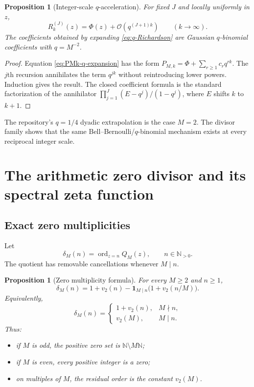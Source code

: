 \documentclass[11pt,oneside]{article}
\newtheorem{proposition}[theorem]{Proposition}
\theoremstyle{definition}
\theoremstyle{remark}
\newcommand{\N}{\mathbb N}
\newcommand{\bigO}{\mathcal O}
\newcommand{\vtwo}{v_2}
\numberwithin{equation}{section}
\newcommand{\ord}{\operatorname{ord}}
\newcommand{\1}{\mathbf 1}
\begin{document}
\begin{proposition}[Integer-scale $q$-acceleration]
\label{prop:q-accel}
For fixed $J$ and locally uniformly in $z$,
\begin{equation}
 R_k^{(J)}(z)=\Phi(z)+\bigO\!\left(q^{(J+1)k}\right)
 \qquad(k\to\infty).
 \label{eq:q-accel-rate}
\end{equation}
The coefficients obtained by expanding \eqref{eq:q-Richardson} are Gaussian
$q$-binomial coefficients with $q=M^{-2}$.
\end{proposition}

\begin{proof}
Equation \eqref{eq:PMk-q-expansion} has the form
$P_{M,k}=\Phi+\sum_{r\ge1}c_rq^{rk}$.  The $j$th recursion annihilates the term
$q^{jk}$ without reintroducing lower powers.  Induction gives the result.  The closed
coefficient formula is the standard factorization of the annihilator
$\prod_{j=1}^J(E-q^j)/(1-q^j)$, where $E$ shifts $k$ to $k+1$.
\end{proof}

The repository's $q=1/4$ dyadic extrapolation is the case $M=2$.  The divisor family
shows that the same Bell--Bernoulli/$q$-binomial mechanism exists at every reciprocal
integer scale.

\section{The arithmetic zero divisor and its spectral zeta function}
\label{sec:zeros}

\subsection{Exact zero multiplicities}

Let
\begin{equation}
 \delta_M(n)=\ord_{z=n}Q_M(z),
 \qquad n\in\N_{>0}.
 \label{eq:deltaM-def}
\end{equation}
The quotient has removable cancellations whenever $M\mid n$.

\begin{proposition}[Zero multiplicity formula]
\label{prop:zero-multiplicity}
For every $M\ge2$ and $n\ge1$,
\begin{equation}
 \delta_M(n)
 =1+\vtwo(n)-\1_{M\mid n}\bigl(1+\vtwo(n/M)\bigr).
 \label{eq:deltaM-general}
\end{equation}
Equivalently,
\begin{equation}
 \delta_M(n)=
 \begin{cases}
 1+\vtwo(n),&M\nmid n,\\
 \vtwo(M),&M\mid n.
 \end{cases}
 \label{eq:deltaM-cases}
\end{equation}
Thus:
\begin{itemize}
\item if $M$ is odd, the positive zero set is $\N\setminus M\N$;
\item if $M$ is even, every positive integer is a zero;
\item on multiples of $M$, the residual order is the constant $\vtwo(M)$.
\end{itemize}
\end{proposition}
\end{document}
